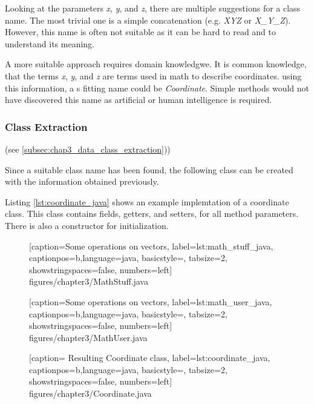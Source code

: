 Looking at the parameters \textit{x}, \textit{y}, and \textit{z}, there are multiple suggestions for a class name. The most trivial one is a simple concatenation  (e.g. \textit{XYZ} or \textit{X\_Y\_Z}). However, this name is often not suitable as it can be hard to read and to understand its meaning.

A more suitable approach requires domain knowledgwe. It is common knowledge, that the terms \textit{x}, \textit{y}, and \textit{z} are terms used in math to describe coordinates. using this information, a s fitting name could be \textit{Coordinate}. Simple methods would not have discovered this name as artificial or human intelligence is required. 

\subsubsection{Class Extraction} (see \ref{subsec:chap3_data_class_extraction}))

Since a suitable class name has been found, the following class can be created with the information obtained previously. 

Listing \ref{lst:coordinate_java} shows an example implemtation of a coordinate class. This class contains fields, getters, and setters, for all method parameters. There is also a constructor for initialization.  

\begin{figure} [htbp!]
			
			[caption={Some operations on vectors},
			label={lst:math_stuff_java},
			captionpos=b,language=java, basicstyle=\footnotesize, tabsize=2, showstringspaces=false,  numbers=left]
			{figures/chapter3/MathStuff.java}
		\end{figure}


  \begin{figure} [htbp!]
			
			[caption={Some operations on vectors},
			label={lst:math_user_java},
			captionpos=b,language=java, basicstyle=\footnotesize, tabsize=2, showstringspaces=false,  numbers=left]
			{figures/chapter3/MathUser.java}
		\end{figure}



  \begin{figure} [htbp!]
			
			[caption={ Resulting Coordinate class},
			label={lst:coordinate_java},
			captionpos=b,language=java, basicstyle=\footnotesize, tabsize=2, showstringspaces=false,  numbers=left]
			{figures/chapter3/Coordinate.java}
		\end{figure}
\hfill
